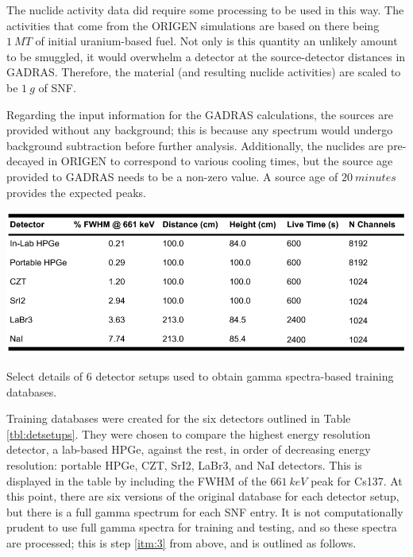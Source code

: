 The nuclide activity data did require some processing to be used in this way.
The activities that come from the \gls{ORIGEN} simulations are based on there
being $1\:MT$ of initial uranium-based fuel. Not only is this quantity an
unlikely amount to be smuggled, it would overwhelm a detector at the
 source-detector distances in \gls{GADRAS}. Therefore, the material (and
resulting nuclide activities) are scaled to be $1\:g$ of \gls{SNF}.

Regarding the input information for the \gls{GADRAS} calculations, the sources
are provided without any background; this is because any spectrum would undergo
background subtraction before further analysis. Additionally, the nuclides are
pre-decayed in \gls{ORIGEN} to correspond to various cooling times, but the
source age provided to \gls{GADRAS} needs to be a non-zero value. A source age
of $20\:minutes$ provides the expected peaks.

\begin{table}[!htb]
  \centering
  \includegraphics[width=\linewidth]{./chapters/exp2/gadras_detectors.png}
  \caption{Select details of 6 detector setups used to obtain gamma 
           spectra-based training databases.}
  \label{tbl:detsetups}
\end{table}

Training databases were created for the six detectors outlined in Table
\ref{tbl:detsetups}. They were chosen to compare the highest energy resolution
detector, a lab-based \gls{HPGe}, against the rest, in order of decreasing
energy resolution: portable \gls{HPGe}, \gls{CZT}, \gls{SrI2}, \gls{LaBr3}, and
\gls{NaI} detectors. This is displayed in the table by including the \gls{FWHM}
of the $661\:keV$ peak for Cs137. At this point, there are six versions of the
original database for each detector setup, but there is a full gamma spectrum
for each \gls{SNF} entry. It is not computationally prudent to use full gamma
spectra for training and testing, and so these spectra are processed; this is
step \ref{itm:3} from above, and is outlined as follows.

